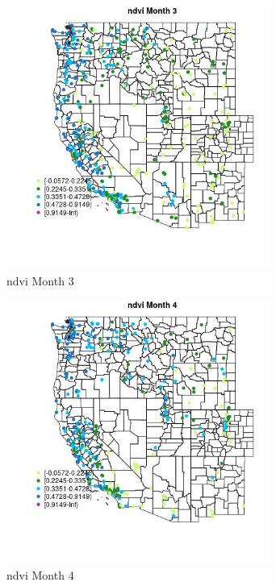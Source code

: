 \begin{figure} 
\centering  
\includegraphics[width=0.77\textwidth]{Code_Outputs/Report_ML_input_PM25_Step4_part_e_de_duplicated_aves_compiled_2019-05-18wNAs_MapObsMo3ndvi.jpg} 
\caption{\label{fig:Report_ML_input_PM25_Step4_part_e_de_duplicated_aves_compiled_2019-05-18wNAsMapObsMo3ndvi}ndvi Month 3} 
\end{figure} 
 

\begin{figure} 
\centering  
\includegraphics[width=0.77\textwidth]{Code_Outputs/Report_ML_input_PM25_Step4_part_e_de_duplicated_aves_compiled_2019-05-18wNAs_MapObsMo4ndvi.jpg} 
\caption{\label{fig:Report_ML_input_PM25_Step4_part_e_de_duplicated_aves_compiled_2019-05-18wNAsMapObsMo4ndvi}ndvi Month 4} 
\end{figure} 
 

